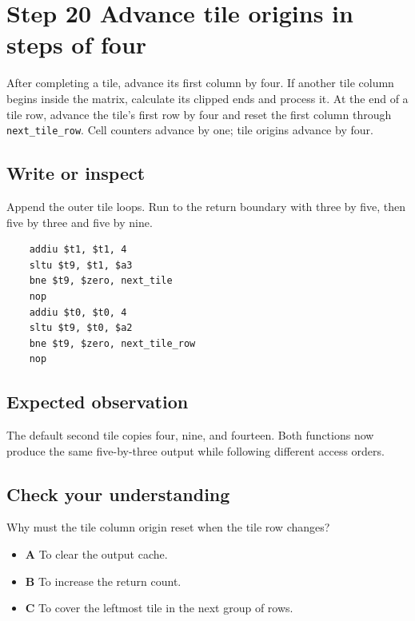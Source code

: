 \section{Step 20 Advance tile origins in steps of four}\label{transpose-s20}

After completing a tile, advance its first column by four. If another tile column begins inside the matrix, calculate its clipped ends and process it. At the end of a tile row, advance the tile's first row by four and reset the first column through \texttt{next\_tile\_row}. Cell counters advance by one; tile origins advance by four.

\subsection{Write or inspect}
Append the outer tile loops. Run to the return boundary with three by five, then five by three and five by nine.

\begin{verbatim}
    addiu $t1, $t1, 4
    sltu $t9, $t1, $a3
    bne $t9, $zero, next_tile
    nop
    addiu $t0, $t0, 4
    sltu $t9, $t0, $a2
    bne $t9, $zero, next_tile_row
    nop
\end{verbatim}

\subsection{Expected observation}
The default second tile copies four, nine, and fourteen. Both functions now produce the same five-by-three output while following different access orders.

\subsection{Check your understanding}
Why must the tile column origin reset when the tile row changes?

\begin{itemize}
  \item \textbf{A} To clear the output cache.
  \item \textbf{B} To increase the return count.
  \item \textbf{C} To cover the leftmost tile in the next group of rows.
\end{itemize}
